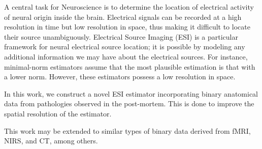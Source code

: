 A central task for Neuroscience is to determine the location of electrical activity of neural origin inside the brain. 
%
Electrical signals can be recorded at a high resolution in time but low resolution in space, thus making it difficult to locate their source unambiguously. 
%
Electrical Source Imaging (ESI) is a particular framework for neural electrical source location; it is possible by modeling any additional information we may have about the electrical sources.
%
For instance, minimal-norm estimators assume that the most plausible estimation is that with a lower norm.
%
However, these estimators possess a low resolution in space. 

In this work, we construct a novel ESI estimator incorporating binary anatomical data from pathologies observed in the post-mortem.
%
This is done to improve the spatial resolution of the estimator.

This work may be extended to similar types of binary data derived from fMRI, NIRS, and CT, among others.